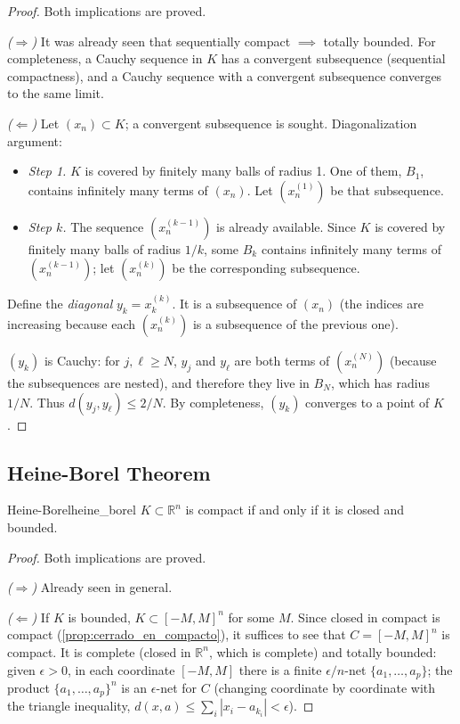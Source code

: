 \documentclass[11pt, a4paper]{article}
\begin{document}
\begin{proof}
Both implications are proved.

\textit{($\Rightarrow$)} It was already seen that sequentially compact $\implies$ totally bounded. For
completeness, a Cauchy sequence in $K$ has a convergent subsequence (sequential
compactness), and a Cauchy sequence with a convergent subsequence converges to the same limit.

\textit{($\Leftarrow$)} Let $(x_n) \subset K$; a convergent subsequence is sought. Diagonalization
argument:
\begin{itemize}
    \item \textit{Step 1.} $K$ is covered by finitely many balls of radius 1. One of them, $B_1$,
    contains infinitely many terms of $(x_n)$. Let $(x_n^{(1)})$ be that subsequence.
    \item \textit{Step $k$.} The sequence $(x_n^{(k-1)})$ is already available. Since $K$ is covered by finitely many balls of
    radius $1/k$, some $B_k$ contains infinitely many terms of $(x_n^{(k-1)})$; let $(x_n^{(k)})$ be the
    corresponding subsequence.
\end{itemize}
Define the \emph{diagonal} $y_k = x_k^{(k)}$. It is a subsequence of $(x_n)$ (the indices are
increasing because each $(x_n^{(k)})$ is a subsequence of the previous one).

$(y_k)$ is Cauchy: for $j, \ell \ge N$, $y_j$ and $y_\ell$ are both terms of $(x_n^{(N)})$
(because the subsequences are nested), and therefore they live in $B_N$, which has radius $1/N$. Thus
$d(y_j, y_\ell) \le 2/N$. By completeness, $(y_k)$ converges to a point of $K$.
\end{proof}

\subsection{Heine-Borel Theorem}

\begin{teorema}{Heine-Borel}{heine_borel}
$K \subset \mathbb{R}^n$ is compact if and only if it is closed and bounded.
\end{teorema}

\begin{proof}
Both implications are proved.

\textit{($\Rightarrow$)} Already seen in general.

\textit{($\Leftarrow$)} If $K$ is bounded, $K \subset [-M, M]^n$ for some $M$.
Since closed in compact is compact (\ref{prop:cerrado_en_compacto}), it suffices to see that
$C = [-M, M]^n$ is compact.
It is complete (closed in $\mathbb{R}^n$, which is complete) and totally bounded:
given $\epsilon > 0$, in each coordinate $[-M, M]$ there is a finite $\epsilon/n$-net
$\{a_1, \dots, a_p\}$; the product $\{a_1, \dots, a_p\}^n$ is an $\epsilon$-net for $C$
(changing coordinate by coordinate with the triangle inequality,
$d(x, a) \le \sum_i |x_i - a_{k_i}| < \epsilon$).
\end{proof}
\end{document}
